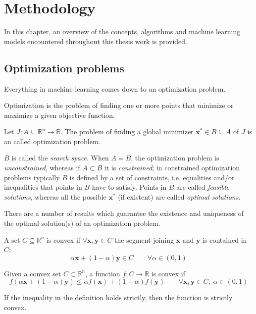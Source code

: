 \chapter{Methodology}
\label{sec:methodology}
In this chapter, an overview of the concepts, algorithms and machine learning models encountered throughout this thesis work is provided.

\section{Optimization problems}
\label{sec:opt_prob}
Everything in machine learning comes down to an optimization problem.

Optimization is the problem of finding one or more points that minimize or maximize a given objective function.

\begin{definition}
Let $J:A \subseteq \mathbb{R}^n \to \mathbb{R}$. The problem of finding a global minimizer $\mathbf{x^*} \in B \subseteq A$ of $J$ is an called optimization problem.
\end{definition}
$B$ is called the \textit{search space}. When $A=B$, the optimization problem is \textit{unconstrained}, whereas if $A \subset B$ it is \textit{constrained}; in constrained optimization problems typically $B$ is defined by a set of constraints, i.e. equalities and/or inequalities that points in $B$ have to satisfy. Points in $B$ are called \textit{feasible solutions}, whereas all the possible $\mathbf{x^*}$ (if existent) are called \textit{optimal solutions}.

There are a number of results which guarantee the existence and uniqueness of the optimal solution(s) of an optimization problem.

\begin{definition}
A set $C \subseteq \mathbb{R}^n$ is convex if $\forall \mathbf{x},\mathbf{y} \in C$ the segment joining $\mathbf{x}$ and $\mathbf{y}$ is contained in $C$:
\[
\alpha \mathbf{x} + (1-\alpha)\mathbf{y} \in C \qquad \forall \alpha \in (0,1)
\]
\end{definition}

\begin{definition}
Given a convex set $C \subset \mathbb{R}^n$, a function $f:C \to \mathbb{R}$ is convex if
\[
f(\alpha \mathbf{x}+(1-\alpha)\mathbf{y}) \leq \alpha f(\mathbf{x}) + (1-\alpha) f(\mathbf{y}) \qquad \forall \mathbf{x},\mathbf{y} \in C, \; \alpha \in (0,1)
\]
\end{definition}
If the inequality in the definition holds strictly, then the function is strictly convex.

